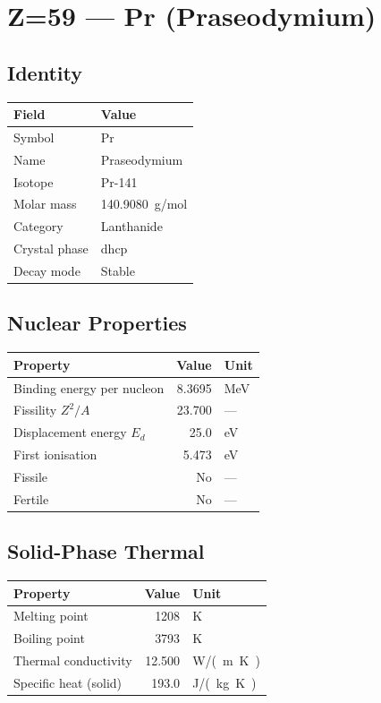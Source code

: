 \documentclass[11pt,a4paper]{article}
\begin{document}
\newpage

\section{Z=59 --- Pr (Praseodymium)}
\label{sec:Z59}

\subsection{Identity}
\begin{tabular}{ll}
  \toprule
  Field & Value \\
  \midrule
  Symbol & Pr \\
  Name & Praseodymium \\
  Isotope & Pr-141 \\
  Molar mass & \SI{140.9080}{g/mol} \\
  Category & Lanthanide \\
  Crystal phase & dhcp \\
  Decay mode & Stable \\
  \bottomrule
\end{tabular}

\subsection{Nuclear Properties}
\begin{tabular}{lrl}
  \toprule
  Property & Value & Unit \\
  \midrule
  Binding energy per nucleon & 8.3695 & \si{MeV} \\
  Fissility $Z^2/A$ & 23.700 & --- \\
  Displacement energy $E_d$ & 25.0 & \si{eV} \\
  First ionisation & 5.473 & \si{eV} \\
  Fissile & No & --- \\
  Fertile & No & --- \\
  \bottomrule
\end{tabular}

\subsection{Solid-Phase Thermal}
\begin{tabular}{lrl}
  \toprule
  Property & Value & Unit \\
  \midrule
  Melting point & 1208 & \si{K} \\
  Boiling point & 3793 & \si{K} \\
  Thermal conductivity & 12.500 & \si{W/(m.K)} \\
  Specific heat (solid) & 193.0 & \si{J/(kg.K)} \\
  \bottomrule
\end{tabular}
\end{document}
